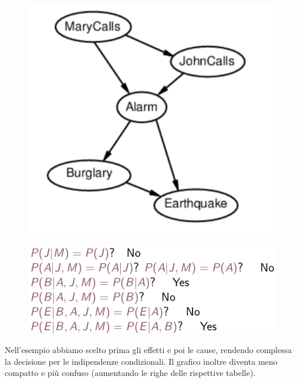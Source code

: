\documentclass[a4paper, notitlepage, 9pt]{extreport}
\begin{document}
\begin{multicols}{2}
	\begin{figure}[H]
		\centering
		\includegraphics[scale=0.29]{BN4}
	\end{figure}
	\columnbreak
	\begin{figure}[H]
		\centering
		\includegraphics[scale=0.37]{BN5}
	\end{figure}
\end{multicols}
\noindent
Nell'esempio abbiamo scelto prima gli effetti e poi le cause, rendendo complessa la decisione per le indipendenze condizionali. Il grafico inoltre diventa meno compatto e più confuso (aumentando le righe delle rispettive tabelle).
\end{document}
